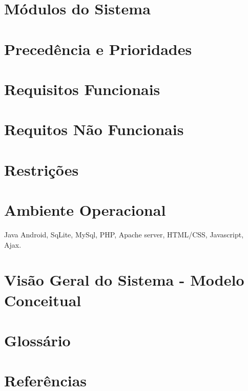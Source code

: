\documentclass[13pt]{article}
\begin{document}
\section*{Módulos do Sistema}
\section*{Precedência e Prioridades}

\section*{Requisitos Funcionais}
\section*{Requitos Não Funcionais}
\section*{Restrições}
\section*{Ambiente Operacional}
Java Android, SqLite, MySql, PHP, Apache server, HTML/CSS, Javascript, Ajax.
\section*{Visão Geral do Sistema - Modelo Conceitual}
\section*{Glossário}

\section*{Referências}

 
\end{document}
